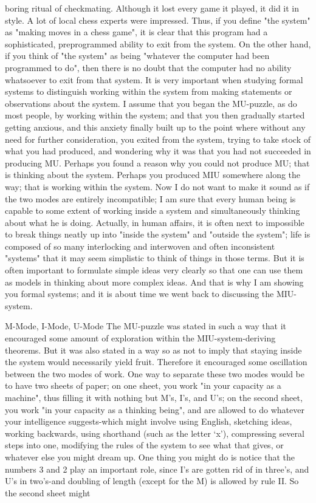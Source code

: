 boring ritual of checkmating. Although it lost every game it played, it did it in style. A lot of local chess experts were impressed. Thus, if you define "the system" as "making moves in a chess game", it is clear that this program had a sophisticated, preprogrammed ability to exit from the system. On the other hand, if you think of "the system" as being "whatever the computer had been programmed to do", then there is no doubt that the computer had no ability whatsoever to exit from that system. It is very important when studying formal systems to distinguish working within the system from making statements or observations about the system. I assume that you began the MU-puzzle, as do most people, by working within the system; and that you then gradually started getting anxious, and this anxiety finally built up to the point where without any need for further consideration, you exited from the system, trying to take stock of what you had produced, and wondering why it was that you had not succeeded in producing MU. Perhaps you found a reason why you could not produce MU; that is thinking about the system. Perhaps you produced MIU somewhere along the way; that is working within the system. Now I do not want to make it sound as if the two modes are entirely incompatible; I am sure that every human being is capable to some extent of working inside a system and simultaneously thinking about what he is doing. Actually, in human affairs, it is often next to impossible to break things neatly up into "inside the system" and "outside the system"; life is composed of so many interlocking and interwoven and often inconsistent "systems" that it may seem simplistic to think of things in those terms. But it is often important to formulate simple ideas very clearly so that one can use them as models in thinking about more complex ideas. And that is why I am showing you formal systems; and it is about time we went back to discussing the MIU- system. 



M-Mode, I-Mode, U-Mode The MU-puzzle was stated in such a way that it encouraged some amount of exploration within the MIU-system-deriving theorems. But it was also stated in a way so as not to imply that staying inside the system would necessarily yield fruit. Therefore it encouraged some oscillation between the two modes of work. One way to separate these two modes would be to have two sheets of paper; on one sheet, you work "in your capacity as a machine", thus filling it with nothing but M's, I's, and U's; on the second sheet, you work "in your capacity as a thinking being", and are allowed to do whatever your intelligence suggests-which might involve using English, sketching ideas, working backwards, using shorthand (such as the letter `x'), compressing several steps into one, modifying the rules of the system to see what that gives, or whatever else you might dream up. One thing you might do is notice that the numbers 3 and 2 play an important role, since I's are gotten rid of in three's, and U's in two's-and doubling of length (except for the M) is allowed by rule II. So the second sheet might 







